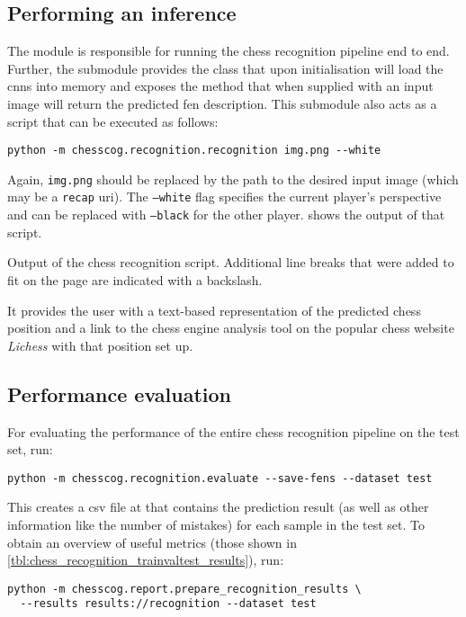 \documentclass[../../report.tex]{subfiles}
\begin{document}
\subsection{Performing an inference}
The  module is responsible for running the chess recognition pipeline end to end.
Further, the  submodule provides the  class that upon initialisation will load the \glspl{cnn} into memory and exposes the  method that when supplied with an input image will return the predicted \gls{fen} description.
This submodule also acts as a script that can be executed as follows:
\begin{verbatim}
python -m chesscog.recognition.recognition img.png --white
\end{verbatim}
Again, \texttt{img.png} should be replaced by the path to the desired input image (which may be a \texttt{recap} \gls{uri}).
The \texttt{--white} flag specifies the current player's perspective and can be replaced with \texttt{--black} for the other player.
 shows the output of that script.
\begin{listing}
    
    \caption[Output of the chess recognition script.]{Output of the chess recognition script. Additional line breaks that were added to fit on the page are indicated with a backslash.}
    \label{lst:chesscog_recognition_output}
\end{listing}
It provides the user with a text-based representation of the predicted chess position and a link to the chess engine analysis tool on the popular chess website \emph{Lichess} with that position set up.

\subsection{Performance evaluation}
For evaluating the performance of the entire chess recognition pipeline on the test set, run:
\begin{verbatim}
python -m chesscog.recognition.evaluate --save-fens --dataset test
\end{verbatim}
This creates a \gls{csv} file at  that contains the prediction result (as well as other information like the number of mistakes) for each sample in the test set.
To obtain an overview of useful metrics (those shown in \cref{tbl:chess_recognition_trainvaltest_results}), run:
\begin{verbatim}
python -m chesscog.report.prepare_recognition_results \
  --results results://recognition --dataset test
\end{verbatim}
\end{document}

